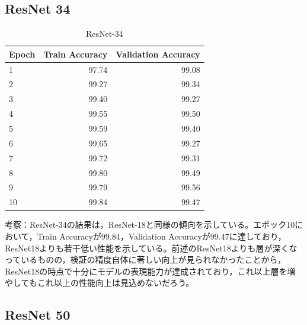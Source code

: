 \documentclass[a4paper,11pt,titlepage]{jsarticle}
\begin{document}
\subsection{ResNet 34}
\begin{table}[h]
\centering
\caption{ResNet-34}
\label{tab:ResNet34}
\begin{tabular}{lrr}
\hline
 Epoch &  Train Accuracy &  Validation Accuracy \\
\hline
     1 &           97.74 &                99.08 \\
     2 &           99.27 &                99.34 \\
     3 &           99.40 &                99.27 \\
     4 &           99.55 &                99.50 \\
     5 &           99.59 &                99.40 \\
     6 &           99.65 &                99.27 \\
     7 &           99.72 &                99.31 \\
     8 &           99.80 &                99.49 \\
     9 &           99.79 &                99.56 \\
    10 &           99.84 &                99.47 \\
\hline
\end{tabular}
\end{table}

考察：ResNet-34の結果は，ResNet-18と同様の傾向を示している。エポック10において，Train Accuracyが99.84，Validation Accuracyが99.47に達しており，ResNet18よりも若干低い性能を示している。前述のResNet18よりも層が深くなっているものの，検証の精度自体に著しい向上が見られなかったことから，ResNet18の時点で十分にモデルの表現能力が達成されており，これ以上層を増やしてもこれ以上の性能向上は見込めないだろう。

\subsection{ResNet 50}
\end{document}
